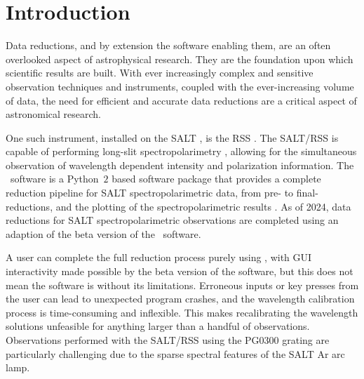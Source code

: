 \chapter{Introduction} \label{ch:01}

Data reductions, and by extension the software enabling them, are an often overlooked aspect of astrophysical research.
They are the foundation upon which scientific results are built.
With ever increasingly complex and sensitive observation techniques and instruments, coupled with the ever-increasing volume of data, the need for efficient and accurate data reductions are a critical aspect of astronomical research.

One such instrument, installed on the \gls{SALT} \citep{SALT_design}, is the \gls{RSS} \citep{SALT_optical_design}.
The \gls{SALT}/\gls{RSS} is capable of performing long-slit spectropolarimetry \citep{SALT_hires}, allowing for the simultaneous observation of wavelength dependent intensity and polarization information.
The \polsalt\ software is a Python~$2$ based software package that provides a complete reduction pipeline for \gls{SALT} spectropolarimetric data, from pre- to final-reductions, and the plotting of the spectro\-polarimetric results \citep{polsalt}.
As of 2024, data reductions for \gls{SALT} spectropolarimetric observations are completed using an adaption of the beta version of the \polsalt\ software.


A user can complete the full reduction process purely using \polsalt, with \gls{GUI} interactivity made possible by the beta version of the software, but this does not mean the software is without its limitations.
Erroneous inputs or key presses from the user can lead to unexpected program crashes, and the wavelength calibration process is time-consuming and inflexible.
This makes recalibrating the wavelength solutions unfeasible for anything larger than a handful of observations.
Observations performed with the \gls{SALT}/\gls{RSS} using the PG$0300$ grating are particularly challenging due to the sparse spectral features of the \gls{SALT} \gls{Ar} arc lamp.


